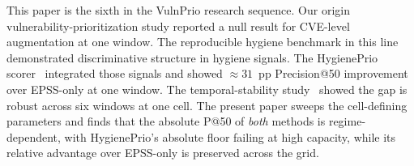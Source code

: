 This paper is the sixth in the VulnPrio research sequence. Our origin
vulnerability-prioritization study reported a null result for CVE-level
augmentation at one window. The reproducible hygiene benchmark in this line
demonstrated discriminative structure
in hygiene signals. The HygienePrio scorer~\cite{paper4hygieneprio} integrated those
signals and showed $\approx 31$~pp Precision@50
improvement over EPSS-only at one window. The temporal-stability study~\cite{paper5temporal}
showed the gap is robust across six windows at one cell. The present
paper sweeps the cell-defining parameters and finds that the absolute
P@50 of \textit{both} methods is regime-dependent, with HygienePrio's
absolute floor failing at high capacity, while its relative
advantage over EPSS-only is preserved across the grid.
